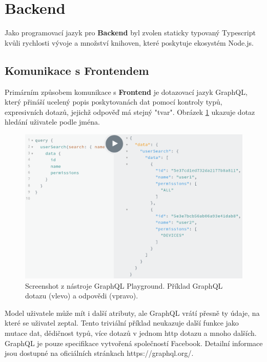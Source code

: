 \section{Backend} \label{backend}

Jako programovací jazyk pro \textbf{Backend} byl zvolen staticky typovaný Typescript kvůli rychlosti vývoje
a množství knihoven, které poskytuje ekosystém Node.js.

\subsection{Komunikace s Frontendem}

Primárním způsobem komunikace s \textbf{Frontend}
je dotazovací jazyk GraphQL, který přináší ucelený popis poskytovanách dat pomocí kontroly typů,
expresivních dotazů, jejichž odpověď má stejný "tvar". Obrázek \ref{fig:graphql_example} ukazuje dotaz hledání uživatele podle jména.

\begin{figure} \centering
\includegraphics[width=145mm]{../img/graphql_example.png}
\caption{Screenshot z nástroje GraphQL Playground. Příklad GraphQL dotazu (vlevo) a odpovědi (vpravo).}
\label{fig:graphql_example}
\end{figure}

Model uživatele může mít i další atributy, ale GraphQL vrátí přesně ty údaje, na které se uživatel zeptal.
Tento triviální příklad neukazuje další funkce jako mutace dat, dědičnost typů, více dotazů v jednom http dotazu
a mnoho dalších.
GraphQL je pouze specifikace vytvořená společností Facebook. Detailní informace jsou dostupné na oficiálních
stránkach https://graphql.org/.

